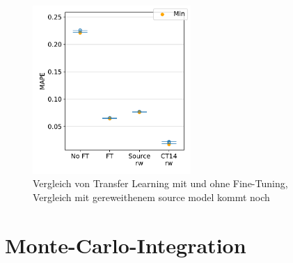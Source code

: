 \begin{figure}
	\centering
	\includegraphics[width=6cm]{graphics/25,29}
	\caption{Vergleich von Transfer Learning mit und ohne Fine-Tuning, Vergleich mit gereweithenem source model kommt noch}
\end{figure}
\section{Monte-Carlo-Integration}
